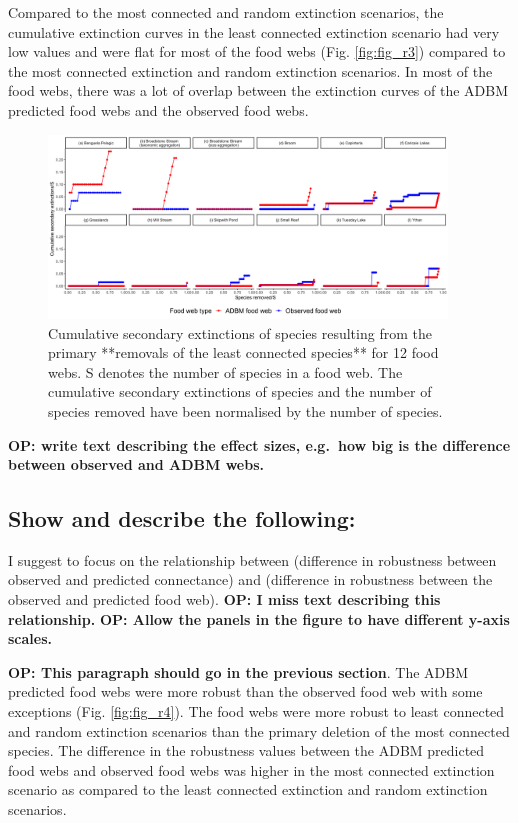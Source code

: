 \documentclass{article}
\begin{document}
Compared to the most connected and random extinction scenarios, the
cumulative extinction curves in the least connected extinction scenario
had very low values and were flat for most of the food webs (Fig.
\ref{fig:fig_r3}) compared to the most connected extinction and random
extinction scenarios. In most of the food webs, there was a lot of
overlap between the extinction curves of the ADBM predicted food webs
and the observed food webs.

\begin{figure}

{\centering \includegraphics[width=400px]{../results/plot_leastconnected} 

}

\caption{\label{fig:fig_r3} Cumulative secondary extinctions of species resulting from the primary **removals of the least connected species** for 12 food webs. S denotes the number of species in a food web. The cumulative secondary extinctions of species and the number of species removed have been normalised by the number of species.}\label{fig:unnamed-chunk-4}
\end{figure}

\textbf{OP: write text describing the effect sizes, e.g.~how big is the
difference between observed and ADBM webs.}

\hypertarget{show-and-describe-the-following}{%
\subsection{Show and describe the
following:}\label{show-and-describe-the-following}}

I suggest to focus on the relationship between (difference in robustness
between observed and predicted connectance) and (difference in
robustness between the observed and predicted food web). \textbf{OP: I
miss text describing this relationship.} \textbf{OP: Allow the panels in
the figure to have different y-axis scales.}

\textbf{OP: This paragraph should go in the previous section}. The ADBM
predicted food webs were more robust than the observed food web with
some exceptions (Fig. \ref{fig:fig_r4}). The food webs were more robust
to least connected and random extinction scenarios than the primary
deletion of the most connected species. The difference in the robustness
values between the ADBM predicted food webs and observed food webs was
higher in the most connected extinction scenario as compared to the
least connected extinction and random extinction scenarios.
\end{document}
